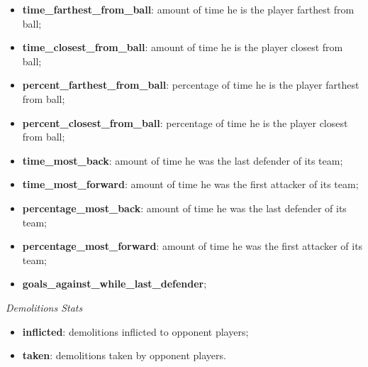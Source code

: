 \begin{itemize}
    \item \textbf{time\_farthest\_from\_ball}: amount of time he is the player farthest from ball;
    \item \textbf{time\_closest\_from\_ball}: amount of time he is the player closest from ball;
    \item \textbf{percent\_farthest\_from\_ball}: percentage of time he is the player farthest from ball;
    \item \textbf{percent\_closest\_from\_ball}: percentage of time he is the player closest from ball;
    \item \textbf{time\_most\_back}: amount of time he was the last defender of its team;
    \item \textbf{time\_most\_forward}: amount of time he was the first attacker of its team;
    \item \textbf{percentage\_most\_back}: amount of time he was the last defender of its team;
    \item \textbf{percentage\_most\_forward}: amount of time he was the first attacker of its team;
    \item \textbf{goals\_against\_while\_last\_defender};
\end{itemize}
\begin{center}
    \textit{Demolitions Stats}
\end{center}
\begin{itemize}
    \item \textbf{inflicted}: demolitions inflicted to opponent players;
    \item \textbf{taken}: demolitions taken by opponent players.
\end{itemize}
